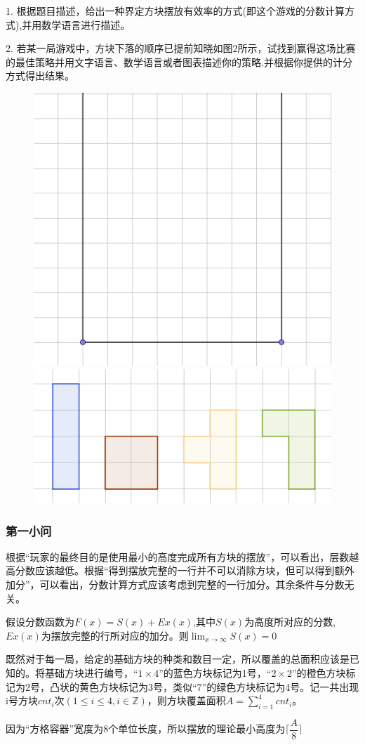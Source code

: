 \documentclass[lang=cn,a4paper]{elegantpaper}
\begin{document}
    1. 根据题目描述，给出一种界定方块摆放有效率的方式(即这个游戏的分数计算方式),并用数学语言进行描述。

    2. 若某一局游戏中，方块下落的顺序已提前知晓如图2所示，试找到赢得这场比赛的最佳策略并用文字语言、数学语言或者图表描述你的策略.并根据你提供的计分方式得出结果。
    \begin{figure}[H]
        \centering
        \includegraphics[scale=0.2]{Container.png}
        \includegraphics[scale=0.4]{basic units.png}
    \end{figure}
    \subsubsection{第一小问}
    根据“玩家的最终目的是使用最小的高度完成所有方块的摆放”，可以看出，层数越高分数应该越低。根据“得到摆放完整的一行并不可以消除方块，但可以得到额外加分”，可以看出，分数计算方式应该考虑到完整的一行加分。其余条件与分数无关。

    假设分数函数为$F(x)=S(x)+Ex(x)$,其中$S(x)$为高度所对应的分数,$Ex(x)$为摆放完整的行所对应的加分。则$\displaystyle\lim_{x\rightarrow \infty}S(x)=0$

    既然对于每一局，给定的基础方块的种类和数目一定，所以覆盖的总面积应该是已知的。将基础方块进行编号，“$1\times4$”的蓝色方块标记为1号，“$2\times2$”的橙色方块标记为2号，凸状的黄色方块标记为3号，类似“7”的绿色方块标记为4号。记一共出现i号方块$cnt_i$次$(1\leqslant i\leqslant 4,i\in\mathbb{Z})$，则方块覆盖面积$A=\sum_{i=1}^4cnt_i$。
    
    因为“方格容器”宽度为8个单位长度，所以摆放的理论最小高度为$\lceil \dfrac{A}{8} \rceil$
\end{document}
